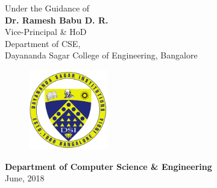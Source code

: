 \begin{titlingpage}
\vfill

Under the Guidance of\\
\Large{\textbf{Dr. Ramesh Babu D. R.}}\\
\large{Vice-Principal \& HoD}\\
Department of CSE,\\
Dayananda Sagar College of Engineering, Bangalore\\

\vspace{0.4cm}

\vfill

\begin{figure}[h]
    \centering
    \includegraphics[height=3.5cm]{images/dsi.png}
\end{figure}

\vfill

\textbf{Department of Computer Science \& Engineering}\\
June, 2018

\end{titlingpage}
